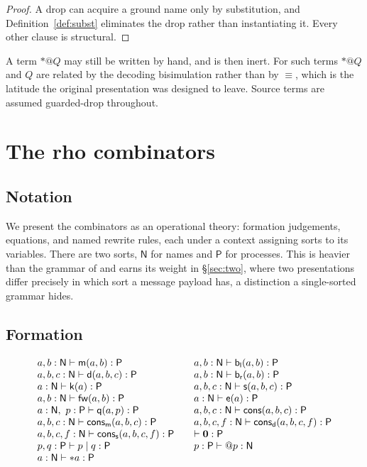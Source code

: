 \documentclass[11pt]{article}
\makeatletter
\theoremstyle{plain}
\theoremstyle{definition}
\theoremstyle{remark}
\newcommand{\quo}[1]{@#1}
\newcommand{\drp}[1]{{*}#1}
\newcommand{\nil}{\mathbf{0}}
\newcommand{\mm}{\mathsf{m}}
\newcommand{\dd}{\mathsf{d}}
\newcommand{\kk}{\mathsf{k}}
\newcommand{\fw}{\mathsf{fw}}
\newcommand{\bl}{\mathsf{b}_{\mathsf{l}}}
\newcommand{\br}{\mathsf{b}_{\mathsf{r}}}
\newcommand{\sy}{\mathsf{s}}
\newcommand{\ev}{\mathsf{e}}
\newcommand{\qq}{\mathsf{q}}
\newcommand{\cons}{\mathsf{cons}}
\newcommand{\scong}{\equiv}
\makeatother
\begin{document}
\begin{proof}
A drop can acquire a ground name only by substitution, and
Definition~\ref{def:subst} eliminates the drop rather than instantiating it.
Every other clause is structural.
\end{proof}

A term $\drp{\quo{Q}}$ may still be written by hand, and is then inert. For
such terms $\drp{\quo{Q}}$ and $Q$ are related by the decoding bisimulation
rather than by $\scong$, which is the latitude the original presentation was
designed to leave. Source terms are assumed guarded-drop throughout.

\section{The rho combinators}
\label{sec:comb}

\subsection{Notation}

We present the combinators as an operational theory: formation judgements,
equations, and named rewrite rules, each under a context assigning sorts to
its variables. There are two sorts, $\mathsf{N}$ for names and $\mathsf{P}$
for processes. This is heavier than the grammar of \cite{rhocomb} and earns
its weight in \S\ref{sec:two}, where two presentations differ precisely in
which sort a message payload has, a distinction a single-sorted grammar hides.

\subsection{Formation}

\[
\begin{array}{l@{\qquad}l}
 a,b : \mathsf{N} \vdash \mm(a,b) : \mathsf{P}
   & a,b : \mathsf{N} \vdash \bl(a,b) : \mathsf{P}\\
 a,b,c : \mathsf{N} \vdash \dd(a,b,c) : \mathsf{P}
   & a,b : \mathsf{N} \vdash \br(a,b) : \mathsf{P}\\
 a : \mathsf{N} \vdash \kk(a) : \mathsf{P}
   & a,b,c : \mathsf{N} \vdash \sy(a,b,c) : \mathsf{P}\\
 a,b : \mathsf{N} \vdash \fw(a,b) : \mathsf{P}
   & a : \mathsf{N} \vdash \ev(a) : \mathsf{P}\\
 a : \mathsf{N},\ p : \mathsf{P} \vdash \qq(a,p) : \mathsf{P}
   & a,b,c : \mathsf{N} \vdash \cons(a,b,c) : \mathsf{P}\\
 a,b,c : \mathsf{N} \vdash \cons_{\mm}(a,b,c) : \mathsf{P}
   & a,b,c,f : \mathsf{N} \vdash \cons_{\dd}(a,b,c,f) : \mathsf{P}\\
 a,b,c,f : \mathsf{N} \vdash \cons_{\sy}(a,b,c,f) : \mathsf{P}
   & \vdash \nil : \mathsf{P}\\
 p,q : \mathsf{P} \vdash p \mid q : \mathsf{P}
   & p : \mathsf{P} \vdash \quo{p} : \mathsf{N}\\
 a : \mathsf{N} \vdash \drp{a} : \mathsf{P}\\
\end{array}
\]
\end{document}
